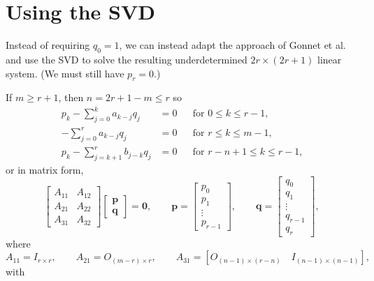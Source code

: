 \documentclass[12pt,a4paper]{article}
\begin{document}
\section{Using the SVD}
Instead of requiring $q_0=1$, we can instead adapt the approach of Gonnet et 
al.~\cite{GonnetEtAl2013} and use the SVD to solve the resulting underdetermined
$2r\times(2r+1)$ linear system.  (We must still have $p_r=0$.) 

If $m\ge r+1$, then $n=2r+1-m\le r$ so
\[
\begin{aligned}
p_k-\sum_{j=0}^k a_{k-j}q_j&=0&&\text{for $0\le k\le r-1$,}\\
-\sum_{j=0}^r a_{k-j}q_j&=0&&\text{for $r\le k\le m-1$,}\\
p_k-\sum_{j=k+1}^rb_{j-k}q_j&=0&&\text{for $r-n+1\le k\le r-1$,}
\end{aligned}
\]
or in matrix form,
\[
\begin{bmatrix}A_{11}&A_{12}\\ A_{21}&A_{22}\\ A_{31}&A_{32}\end{bmatrix}
\begin{bmatrix}\boldsymbol{p}\\ \boldsymbol{q}\end{bmatrix}=\boldsymbol{0},
\qquad\boldsymbol{p}=\begin{bmatrix}p_0\\ p_1\\ \vdots\\ p_{r-1}\end{bmatrix},
\qquad\boldsymbol{q}=\begin{bmatrix}q_0\\ q_1\\ \vdots\\ q_{r-1}\\q_r
\end{bmatrix},
\]
where
\[
A_{11}=I_{r\times r},\qquad
A_{21}=O_{(m-r)\times r},\qquad
A_{31}=[O_{(n-1)\times(r-n)}\quad I_{(n-1)\times(n-1)}],
\]
with
\end{document}
